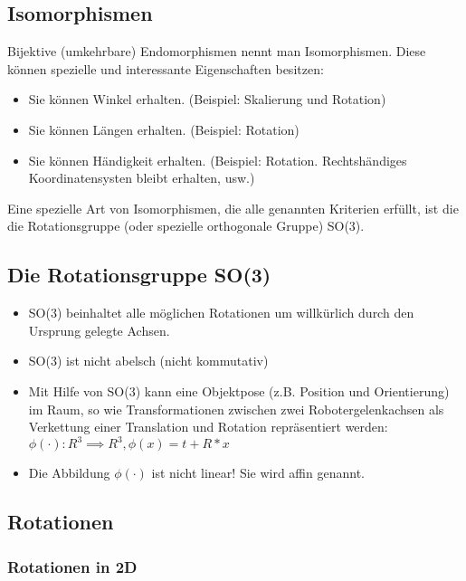 \documentclass[paper=a4, fontsize=11pt]{scrartcl} %
\numberwithin{equation}{section} %
\numberwithin{figure}{section} %
\numberwithin{table}{section} %
\begin{document}
\subsection{Isomorphismen}

Bijektive (umkehrbare) Endomorphismen nennt man Isomorphismen. Diese können spezielle und interessante Eigenschaften besitzen:
\begin{itemize}
\item Sie können Winkel erhalten. (Beispiel: Skalierung und Rotation)
\item Sie können Längen erhalten. (Beispiel: Rotation)
\item Sie können Händigkeit erhalten. (Beispiel: Rotation. Rechtshändiges Koordinatensysten bleibt erhalten, usw.)
\end{itemize}

Eine spezielle Art von Isomorphismen, die alle genannten Kriterien erfüllt, ist die die Rotationsgruppe (oder spezielle orthogonale Gruppe) SO(3).

\subsection{Die Rotationsgruppe SO(3)}

\begin{itemize}
\item SO(3) beinhaltet alle möglichen Rotationen um willkürlich durch den Ursprung gelegte Achsen.
\item SO(3) ist nicht abelsch (nicht kommutativ)
\item Mit Hilfe von SO(3) kann eine Objektpose (z.B. Position und Orientierung) im Raum, so wie Transformationen zwischen zwei Robotergelenkachsen als Verkettung einer Translation und Rotation repräsentiert werden: $\phi(\cdot): R^3 \implies R^3, \phi(x) = t + R * x$
\item Die Abbildung $\phi(\cdot)$ ist nicht linear! Sie wird affin genannt.
\end{itemize}

\subsection{Rotationen}

\subsubsection{Rotationen in 2D}
\end{document}
